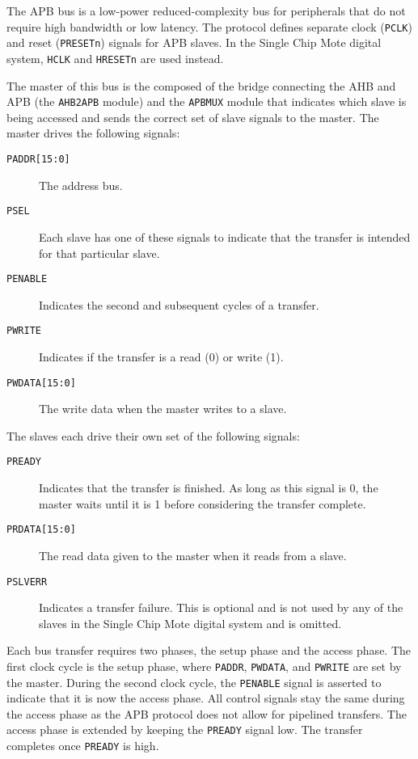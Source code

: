 The APB bus is a low-power reduced-complexity bus for peripherals that do not require high bandwidth or low latency. The protocol defines separate clock (\texttt{PCLK}) and reset (\texttt{PRESETn}) signals for APB slaves. In the Single Chip Mote digital system, \texttt{HCLK} and \texttt{HRESETn} are used instead.

The master of this bus is the composed of the bridge connecting the AHB and APB (the \texttt{AHB2APB} module) and the \texttt{APBMUX} module that indicates which slave is being accessed and sends the correct set of slave signals to the master. The master drives the following signals:

\begin{description}
	\item[\texttt{PADDR[15:0]}] The address bus.
	\item[\texttt{PSEL}] Each slave has one of these signals to indicate that the transfer is intended for that particular slave.
	\item[\texttt{PENABLE}] Indicates the second and subsequent cycles of a transfer.
	\item[\texttt{PWRITE}] Indicates if the transfer is a read (0) or write (1).
	\item[\texttt{PWDATA[15:0]}] The write data when the master writes to a slave.
\end{description}

The slaves each drive their own set of the following signals:

\begin{description}
	\item[\texttt{PREADY}] Indicates that the transfer is finished. As long as this signal is 0, the master waits until it is 1 before considering the transfer complete.
	\item[\texttt{PRDATA[15:0]}] The read data given to the master when it reads from a slave.
	\item[\texttt{PSLVERR}] Indicates a transfer failure. This is optional and is not used by any of the slaves in the Single Chip Mote digital system and is omitted.
\end{description}

Each bus transfer requires two phases, the setup phase and the access phase. The first clock cycle is the setup phase, where \texttt{PADDR}, \texttt{PWDATA}, and \texttt{PWRITE} are set by the master. During the second clock cycle, the \texttt{PENABLE} signal is asserted to indicate that it is now the access phase. All control signals stay the same during the access phase as the APB protocol does not allow for pipelined transfers. The access phase is extended by keeping the \texttt{PREADY} signal low. The transfer completes once \texttt{PREADY} is high.

